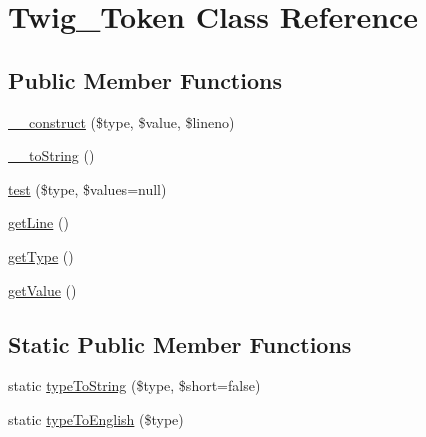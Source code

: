 \hypertarget{classTwig__Token}{}\section{Twig\+\_\+\+Token Class Reference}
\label{classTwig__Token}
\subsection*{Public Member Functions}
\begin{DoxyCompactItemize}
\item 
\hyperlink{classTwig__Token_af72de56ad37007fe105a91a1828ceb8d}{\+\_\+\+\_\+construct} (\$type, \$value, \$lineno)
\item 
\hyperlink{classTwig__Token_a1e4f0a26be90e4f4fa3d58ce6f78ac8b}{\+\_\+\+\_\+to\+String} ()
\item 
\hyperlink{classTwig__Token_a71ae9b322ffa6407664b2dd5b52b15fb}{test} (\$type, \$values=null)
\item 
\hyperlink{classTwig__Token_a2ca571c36abd6fb560ab1e3a092b2d05}{get\+Line} ()
\item 
\hyperlink{classTwig__Token_a1c5a47f56b35a838599d940444ef8402}{get\+Type} ()
\item 
\hyperlink{classTwig__Token_a67f588f387a7b2c8f20b3e4cbc5b340f}{get\+Value} ()
\end{DoxyCompactItemize}
\subsection*{Static Public Member Functions}
\begin{DoxyCompactItemize}
\item 
static \hyperlink{classTwig__Token_a6f50383507fdd76eeaeea949ed101d6e}{type\+To\+String} (\$type, \$short=false)
\item 
static \hyperlink{classTwig__Token_acf5b77ad3a460c5a29b260a0acce442d}{type\+To\+English} (\$type)
\end{DoxyCompactItemize}
